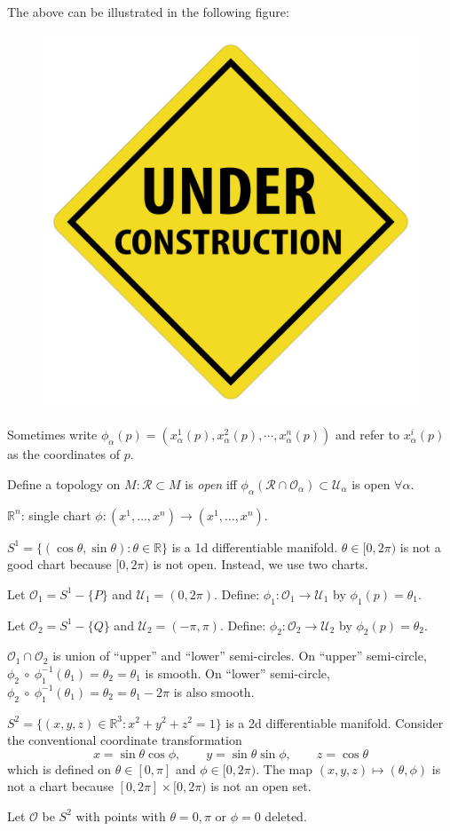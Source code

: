 \documentclass[a4paper,11pt]{article}
\begin{document}
	The above can be illustrated in the following figure:
	\begin{figure}[H]
		\centering
		\includegraphics[width=0.5\linewidth]{fig/default}
	\end{figure}

	Sometimes write $\phi_\alpha(p) = (x_\alpha^1 (p), x_\alpha^2 (p), \cdots, x_\alpha^n (p))$ and refer to $x^i_\alpha(p)$ as the coordinates of $p$.

	Define a topology on $M: \mathcal{R} \subset M$ is \emph{open} iff $\phi_\alpha (\mathcal{R}\cap \mathcal{O}_\alpha) \subset \mathcal{U}_{\alpha}$ is open $\forall \alpha$.  

	\begin{ex}
		$\mathbb{R}^n$: single chart $\phi: (x^1, \dots, x^n) \to (x^1, \dots, x^n)$. 
	\end{ex}

	\begin{ex}
		$S^1 = \{(\cos \theta, \sin \theta): \theta \in \mathbb{R}\}$ is a 1d differentiable manifold. $\theta\in [0,2\pi)$ is not a good chart because $[0,2\pi)$ is not open. Instead, we use two charts. 
		
		Let $\mathcal{O}_1 = S^1 - \{P\}$ and $\mathcal{U}_1 = (0,2\pi)$. Define: $\phi_1: \mathcal{O}_1 \to \mathcal{U}_1$ by $\phi_1(p) = \theta_1$. 
		
		Let $\mathcal{O}_2 = S^1 - \{Q\}$ and $\mathcal{U}_2 = (-\pi,\pi)$. Define: $\phi_2: \mathcal{O}_2 \to \mathcal{U}_2$ by $\phi_2(p) = \theta_2$. 
		
		$\mathcal{O}_1 \cap \mathcal{O}_2$ is union of ``upper'' and ``lower'' semi-circles. On ``upper'' semi-circle, $\phi_2 \ \circ \ \phi_1^{-1}(\theta_1) = \theta_2 = \theta_1$ is smooth. On ``lower'' semi-circle, $\phi_2 \ \circ \ \phi_1^{-1}(\theta_1) = \theta_2 = \theta_1 - 2\pi$ is also smooth.
	\end{ex}

	\begin{ex}
		$S^2 = \{(x,y,z)\in \mathbb{R}^3 : x^2+y^2+z^2 = 1\}$ is a 2d differentiable manifold. Consider the conventional coordinate transformation $$x = \sin \theta \cos \phi,\qquad y = \sin \theta \sin \phi,\qquad z = \cos\theta$$ which is defined on $\theta \in [0,\pi]$ and $\phi \in [0,2\pi)$. The map $(x,y,z) \mapsto (\theta, \phi)$ is not a chart because $[0,2\pi]\times [0,2\pi)$ is not an open set.
		
		Let $\mathcal{O}$ be $S^2$ with points with $\theta = 0, \pi$ or $\phi = 0$ deleted.
	\end{ex}
\end{document}
